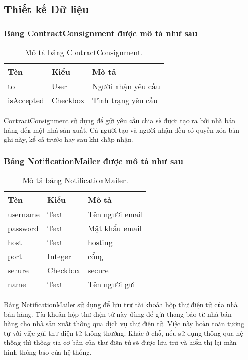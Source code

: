\fontsize{13px}{13px}\selectfont\justifying

\subsection{Thiết kế Dữ liệu}
\subsubsection{Bảng ContractConsignment được mô tả như sau}
\begin{table}[!htbp]\fontsize{13px}{13px}\selectfont\justifying
\begin{center}
\caption{Mô tả bảng ContractConsignment.}
\label{table:ContractConsignment}
\begin{tabularx}{0.6\textwidth}{ |l|l|X| } 
\hline
Tên & Kiểu & Mô tả \\
\hline
to & User & Người nhận yêu cầu \\
isAccepted & Checkbox & Tình trạng yêu cầu \\
\hline
\end{tabularx}
\end{center}
\justifying
ContractConsignment sử dụng để gửi yêu cầu chia sẻ được tạo ra bởi nhà bán hàng đến một nhà sản xuất. Cả người tạo và người nhận đều có quyền xóa bản ghi này, kể cả trước hay sau khi chấp nhận.
\end{table}

\subsubsection{Bảng NotificationMailer được mô tả như sau}
\begin{table}[!htbp]\fontsize{13px}{13px}\selectfont\justifying
\begin{center}
\caption{Mô tả bảng NotificationMailer.}
\begin{tabularx}{0.6\textwidth}{ |l|l|X| } 
\hline
Tên & Kiểu & Mô tả \\
\hline
username & Text & Tên người email \\
password & Text & Mật khẩu email \\
host & Text & hosting \\
port & Integer & cổng \\
secure & Checkbox & secure \\
name & Text & Tên người gửi \\ 
\hline
\end{tabularx}
\label{table:NotificationMailer}
\end{center}
\justifying
Bảng NotificationMailer sử dụng để lưu trữ tài khoản hộp thư điện tử của nhà bán hàng. Tài khoản hộp thư điện tử này dùng để gửi thông báo từ nhà bán hàng cho nhà sản xuất thông qua dịch vụ thư điện tử. Việc này hoàn toàn tương tự với việc gửi thư điện tử thông thường. Khác ở chỗ, nếu sử dụng thông qua hệ thống thì thông tin cơ bản của thư điện tử sẽ được lưu trữ và hiển thị lại màn hình thông báo của hệ thống.
\end{table}
\clearpage
